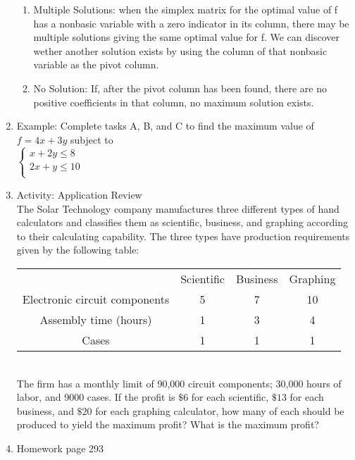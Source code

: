 \documentclass[12pt]{amsart}
\begin{document}
\begin{enumerate}
\begin{enumerate}
		\item Multiple Solutions: when the simplex matrix for the optimal value of f has a nonbasic variable with a zero indicator in its column, there may be multiple solutions giving the same optimal value for f. We can discover wether another solution exists by using the column of that nonbasic variable as the pivot column.
		
		\item No Solution: If, after the pivot column has been found, there are no positive coefficients in that column, no maximum solution exists. 
	\end{enumerate}		
\item Example: Complete tasks A, B, and C to find the maximum value of $f = 4x + 3y$ subject to \\
	
	$ \begin{cases}
		x + 2y \leq 8 \\
		2x + y \leq 10 \\
	\end{cases} $	
	
	\vspace{8in}
	
\item Activity: Application Review\\
The Solar Technology company manufactures three different types of hand calculators and classifies them as scientific, business, and graphing according to their calculating capability. The three types have production requirements given by the following table: \\

\begin{tabular}{|c|c|c|c|}
\hline
& Scientific & Business & Graphing \\
Electronic circuit components & 5& 7& 10\\
Assembly time (hours) & 1& 3& 4\\
Cases & 1 & 1 & 1\\
\hline 
\end{tabular} \\
The firm has a monthly limit of 90,000 circuit components; 30,000 hours of labor, and 9000 cases. If the profit is $\$6$ for each scientific, $\$13$ for each business, and $\$20$ for each graphing calculator, how many of each should be produced to yield the maximum profit? What is the maximum profit? \\

\newpage
\vspace{8in}

\item Homework page 293		
\end{enumerate}
\newpage
\end{document}
